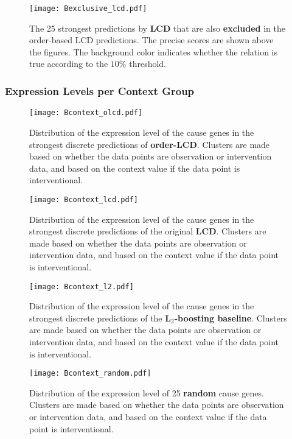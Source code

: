 \begin{figure}[H]
    \centering
    \texttt{[image: Bexclusive\_lcd.pdf]}
    \caption{The 25 strongest predictions by \textbf{LCD} that are also \textbf{excluded} in the order-based LCD predictions. The precise scores are shown above the figures. The background color indicates whether the relation is true according to the $10\%$ threshold.}
\end{figure}


\subsubsection{Expression Levels per Context Group}

\begin{figure}[H]
    \centering
    \texttt{[image: Bcontext\_olcd.pdf]}
    \caption{Distribution of the expression level of the cause genes in the strongest discrete predictions of \textbf{order-LCD}. Clusters are made based on whether the data points are observation or intervention data, and based on the context value if the data point is interventional.}
\end{figure}

\begin{figure}[H]
    \centering
    \texttt{[image: Bcontext\_lcd.pdf]}
    \caption{Distribution of the expression level of the cause genes in the strongest discrete predictions of the original \textbf{LCD}. Clusters are made based on whether the data points are observation or intervention data, and based on the context value if the data point is interventional.}
\end{figure}


\begin{figure}[H]
    \centering
    \texttt{[image: Bcontext\_l2.pdf]}
    \caption{Distribution of the expression level of the cause genes in the strongest discrete predictions of the \textbf{L$_2$-boosting baseline}. Clusters are made based on whether the data points are observation or intervention data, and based on the context value if the data point is interventional.}
\end{figure}

\begin{figure}[H]
    \centering
    \texttt{[image: Bcontext\_random.pdf]}
    \caption{Distribution of the expression level of 25 \textbf{random} cause genes. Clusters are made based on whether the data points are observation or intervention data, and based on the context value if the data point is interventional.}
\end{figure}


